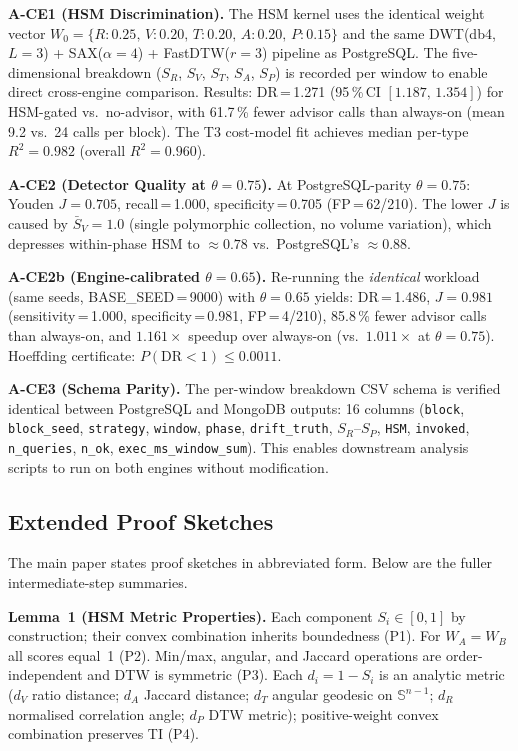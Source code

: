 \documentclass[10pt,twocolumn,a4paper]{article}
\newcommand{\SR}{S_{R}}
\newcommand{\SV}{S_{V}}
\newcommand{\ST}{S_{T}}
\newcommand{\SA}{S_{A}}
\newcommand{\SPER}{S_{P}}
\begin{document}
\textbf{A-CE1 (HSM Discrimination).}
The HSM kernel uses the identical weight vector
$W_0\!=\!\{R\!:\!0.25,\,V\!:\!0.20,\,T\!:\!0.20,\,A\!:\!0.20,\,P\!:\!0.15\}$
and the same DWT(db4, $L\!=\!3$) + SAX($\alpha\!=\!4$) +
FastDTW($r\!=\!3$) pipeline as PostgreSQL. The five-dimensional
breakdown ($\SR$, $\SV$, $\ST$, $\SA$, $\SPER$) is recorded per
window to enable direct cross-engine comparison.
Results: DR\,=\,1.271 (95\,\%\,CI $[1.187,\,1.354]$) for HSM-gated
vs.\ no-advisor, with 61.7\,\% fewer advisor calls than always-on
(mean 9.2 vs.\ 24 calls per block).
The T3 cost-model fit achieves median per-type
$R^2\!=\!0.982$ (overall $R^2\!=\!0.960$).

\textbf{A-CE2 (Detector Quality at $\theta\!=\!0.75$).}
At PostgreSQL-parity $\theta\!=\!0.75$: Youden $J\!=\!0.705$,
recall\,=\,1.000, specificity\,=\,0.705 (FP\,=\,62/210).
The lower $J$ is caused by $\bar{S}_V\!=\!1.0$ (single polymorphic
collection, no volume variation), which depresses within-phase HSM
to $\approx\!0.78$ vs.\ PostgreSQL's $\approx\!0.88$.

\textbf{A-CE2b (Engine-calibrated $\theta\!=\!0.65$).}
Re-running the \emph{identical} workload (same seeds, BASE\_SEED\,=\,9000)
with $\theta\!=\!0.65$ yields:
DR\,=\,1.486, $J\!=\!0.981$ (sensitivity\,=\,1.000, specificity\,=\,0.981,
FP\,=\,4/210), 85.8\,\% fewer advisor calls than always-on,
and $1.161\times$ speedup over always-on (vs.\ $1.011\times$ at
$\theta\!=\!0.75$).
Hoeffding certificate: $P(\text{DR}<1)\!\le\!0.0011$.

\textbf{A-CE3 (Schema Parity).}
The per-window breakdown CSV schema is verified identical between
PostgreSQL and MongoDB outputs: 16 columns
(\texttt{block}, \texttt{block\_seed}, \texttt{strategy},
\texttt{window}, \texttt{phase}, \texttt{drift\_truth},
$\SR$--$\SPER$, \texttt{HSM}, \texttt{invoked},
\texttt{n\_queries}, \texttt{n\_ok},
\texttt{exec\_ms\_window\_sum}).
This enables downstream analysis scripts to run on both engines
without modification.

\subsection{Extended Proof Sketches}

The main paper states proof sketches in abbreviated form.
Below are the fuller intermediate-step summaries.

\textbf{Lemma~1 (HSM Metric Properties).}
Each component $S_i\in[0,1]$ by construction; their convex combination
inherits boundedness (P1). For $W_A\!=\!W_B$ all scores equal~1 (P2).
Min/max, angular, and Jaccard operations are order-independent and
DTW is symmetric (P3). Each $d_i\!=\!1-S_i$ is an analytic metric
($d_V$ ratio distance; $d_A$ Jaccard distance; $d_T$ angular geodesic
on $\mathbb{S}^{n-1}$; $d_R$ normalised correlation angle; $d_P$ DTW
metric); positive-weight convex combination preserves TI (P4).
\end{document}
